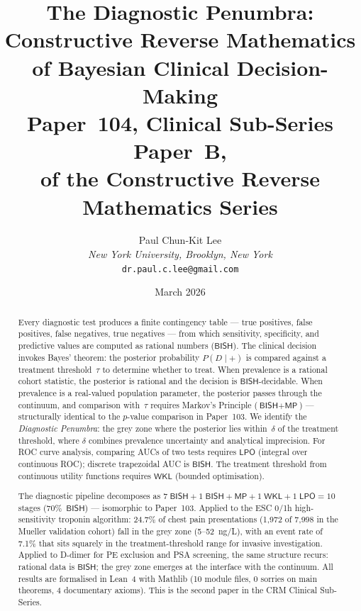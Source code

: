 \documentclass[11pt,a4paper]{article}
\theoremstyle{plain}
\theoremstyle{definition}
\newcommand{\BISH}{\textsf{BISH}}
\newcommand{\WKL}{\textsf{WKL}}
\newcommand{\LPO}{\textsf{LPO}}
\newcommand{\MP}{\textsf{MP}}
\begin{document}
\title{\textbf{The Diagnostic Penumbra:\\
Constructive Reverse Mathematics of Bayesian Clinical Decision-Making}\\[6pt]
\large Paper~104, Clinical Sub-Series Paper~B,\\
of the Constructive Reverse Mathematics Series}

\author{Paul Chun-Kit Lee\\
\textit{New York University, Brooklyn, New York}\\
\texttt{dr.paul.c.lee@gmail.com}}

\date{March 2026}
\maketitle

\begin{abstract}
Every diagnostic test produces a finite contingency table --- true positives, false positives, false negatives, true negatives --- from which sensitivity, specificity, and predictive values are computed as rational numbers ($\BISH$).  The clinical decision invokes Bayes' theorem: the posterior probability $P(D \mid +)$ is compared against a treatment threshold~$\tau$ to determine whether to treat.  When prevalence is a rational cohort statistic, the posterior is rational and the decision is $\BISH$-decidable.  When prevalence is a real-valued population parameter, the posterior passes through the continuum, and comparison with~$\tau$ requires Markov's Principle ($\BISH + \MP$) --- structurally identical to the $p$-value comparison in Paper~103.  We identify the \emph{Diagnostic Penumbra}: the grey zone where the posterior lies within~$\delta$ of the treatment threshold, where $\delta$ combines prevalence uncertainty and analytical imprecision.  For ROC curve analysis, comparing AUCs of two tests requires $\LPO$ (integral over continuous ROC); discrete trapezoidal AUC is $\BISH$.  The treatment threshold from continuous utility functions requires $\WKL$ (bounded optimisation).

The diagnostic pipeline decomposes as $7\;\BISH + 1\;\BISH{+}\MP + 1\;\WKL + 1\;\LPO = 10$ stages (70\%~$\BISH$) --- isomorphic to Paper~103.  Applied to the ESC 0/1h high-sensitivity troponin algorithm: 24.7\% of chest pain presentations (1{,}972 of 7{,}998 in the Mueller validation cohort) fall in the grey zone (5--52~ng/L), with an event rate of 7.1\% that sits squarely in the treatment-threshold range for invasive investigation.  Applied to D-dimer for PE exclusion and PSA screening, the same structure recurs: rational data is $\BISH$; the grey zone emerges at the interface with the continuum.  All results are formalised in Lean~4 with Mathlib (10 module files, 0 sorries on main theorems, 4 documentary axioms).  This is the second paper in the CRM Clinical Sub-Series.
\end{abstract}
\end{document}
